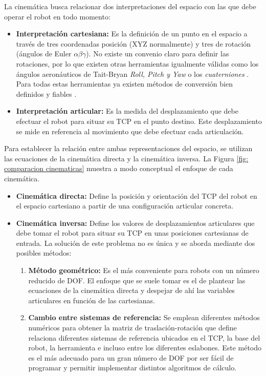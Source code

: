 La cinemática busca relacionar dos interpretaciones del espacio con las que debe operar el robot en todo momento:
\begin{itemize}
    \item \textbf{Interpretación cartesiana:} Es la definición de un punto en el espacio a través de tres coordenadas posición (XYZ normalmente) y tres de rotación (ángulos de Euler $\alpha\beta\gamma$)\cite{euler_agle_formulas}. No existe un convenio claro para definir las rotaciones, por lo que existen otras herramientas igualmente válidas como los ángulos aeronáuticos de Tait-Bryan \textit{Roll, Pitch y Yaw} \cite{quaternions_applications} o los \textit{cuaterniones} \cite{Quaternion_Algebra}. Para todas estas herramientas ya existen métodos de conversión bien definidos y fiables \cite{quaternions_and_Euler_Angles}.

    \item \textbf{Interpretación articular:} Es la medida del desplazamiento que debe efectuar el robot para situar su \acrshort{TCP} en el punto destino. Este desplazamiento se mide en referencia al movimiento que debe efectuar cada articulación.
\end{itemize}

Para establecer la relación entre ambas representaciones del espacio, se utilizan las ecuaciones de la cinemática directa y la cinemática inversa. La Figura \ref{fig: comparacion cinematicas} muestra a modo conceptual el enfoque de cada cinemática.

\begin{itemize}
    \item \textbf{Cinemática directa:} Define la posición y orientación del \acrshort{TCP} del robot en el espacio cartesiano a partir de una configuración articular concreta. 

    \item \textbf{Cinemática inversa:} Define los valores de desplazamientos articulares que debe tomar el robot para situar su \acrshort{TCP} en unas posiciones cartesianas de entrada. La solución de este problema no es única y se aborda mediante dos posibles métodos:
        \begin{enumerate}
            \item \textbf{Método geométrico:} Es el más conveniente para robots con un número reducido de \acrshort{DOF}. El enfoque que se suele tomar es el de plantear las ecuaciones de la cinemática directa y despejar de ahí las variables articulares en función de las cartesianas.
            \item \textbf{Cambio entre sistemas de referencia:} Se emplean diferentes métodos numéricos para obtener la matriz de traslación-rotación que define relaciona diferentes sistemas de referencia ubicados en el \acrshort{TCP}, la base del robot, la herramienta e incluso entre los diferentes eslabones. Este método es el más adecuado para un gran número de \acrshort{DOF} por ser fácil de programar y permitir implementar distintos algoritmos de cálculo.
        \end{enumerate}
\end{itemize}

